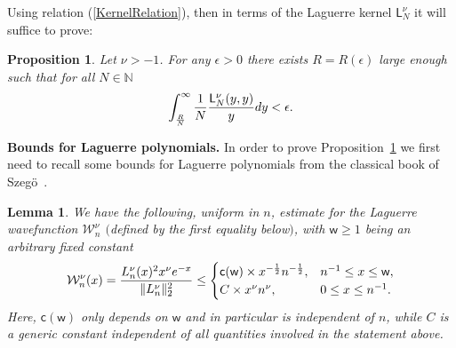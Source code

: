 \documentclass[11pt]{article}
\numberwithin{equation}{section}
\newtheorem{Lemma}[Theorem]{Lemma}
\newtheorem{Proposition}[Theorem]{Proposition}
{ \theoremstyle{definition}
\newtheorem{Definition}[Theorem]{Definition}
\newtheorem{Remark}[Theorem]{Remark} }
\begin{document}
Using relation (\ref{KernelRelation}), then in terms of the Laguerre kernel $\mathsf{L}_N^{\nu}$ it will suffice to prove:

\begin{Proposition}\label{EstimateLaguerre}
Let $\nu>-1$. For any $\epsilon>0$ there exists $R=R(\epsilon)$ large enough such that for all $N \in \mathbb{N}$
\begin{gather*}
\int_{\frac{R}{N}}^{\infty}\frac{1}{N}\frac{\mathsf{L}_N^{\nu}(y,y)}{y}{\rm d}y<\epsilon.
\end{gather*}
\end{Proposition}

{\bf Bounds for Laguerre polynomials.} In order to prove Proposition~\ref{EstimateLaguerre} we first need to recall some bounds for Laguerre polynomials from the classical book of Szeg\"{o}~\cite{Szego}.

\begin{Lemma}\label{wavefunctionestimate}We have the following, uniform in $n$, estimate for the Laguerre wavefunction $\mathcal{W}_n^{\nu}$ $($defined by the first equality below$)$, with $\mathsf{w}\ge 1$ being an arbitrary fixed constant
\begin{gather*}%
\mathcal{W}_{n}^{\nu}(x)=\frac{L_n^{\nu}(x)^2x^{\nu}{\rm e}^{-x}}{\|L_n^{\nu}\|_2^2}\le \begin{cases}
\mathsf{c}(\mathsf{w})\times x^{-\frac{1}{2}}n^{-\frac{1}{2}}, & n^{-1}\le x \le \mathsf{w},\\
C\times x^\nu n^{\nu}, & 0 \le x \le n^{-1}.
\end{cases}
\end{gather*}
Here, $\mathsf{c}(\mathsf{w})$ only depends on $\mathsf{w}$ and in particular is independent of $n$, while $C$ is a generic constant independent of all quantities involved in the statement above.
\end{Lemma}
\end{document}
